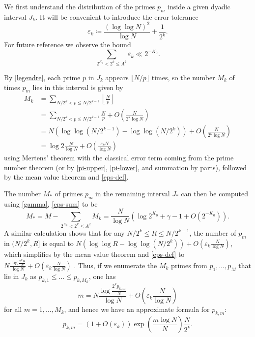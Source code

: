 \documentclass[12pt,a4paper,reqno]{amsart}
\numberwithin{equation}{section}
\theoremstyle{plain}
\theoremstyle{definition}
\newcommand\eps{\varepsilon}
\begin{document}
We first understand the distribution of the primes $p_m$ inside a given dyadic interval $J_k$.  It will be convenient to introduce the error tolerance
\begin{equation}\label{eps-def}
   \eps_k \coloneqq \frac{(\log\log N)^2}{\log N} + \frac{1}{2^k}.
\end{equation}
For future reference we observe the bound
\begin{equation}\label{eps-sum}
\sum_{2^{K_0} < 2^k \leq A^2} \eps_k \ll 2^{-K_0}.
\end{equation}


By \eqref{legendre}, each prime $p$ in $J_k$ appears $\lfloor N/p\rfloor$ times, so the number $M_k$ of times $p_m$ lies in this interval is given by
\begin{align*}
  M_k &= \sum_{N/2^k < p \leq N/2^{k-1}} \left\lfloor \frac{N}{p} \right\rfloor \\
  &= \sum_{N/2^k < p \leq N/2^{k-1}} \frac{N}{p} + O\left( \frac{N}{2^k \log N} \right) \\
  &= N(\log\log(N/2^{k-1}) - \log\log(N/2^k)) + O\left( \frac{N}{2^k \log N}\right)\\
  &= \log 2 \frac{N}{\log N} + O\left( \frac{\eps_k N}{\log N} \right)
\end{align*}
using Mertens' theorem with the classical error term coming from the prime number theorem (or by \eqref{pi-upper}, \eqref{pi-lower}, and summation by parts), followed by the mean value theorem and \eqref{eps-def}.

The number $M_*$ of primes $p_m$ in the remaining interval $J_*$ can then be computed using \eqref{gamma}, \eqref{eps-sum} to be
\begin{equation}\label{ms}
 M_* = M - \sum_{2^{K_0} < 2^k \leq A^2} M_k = \frac{N}{\log N} (\log 2^{K_0} + \gamma - 1 + O(2^{-K_0}) ).
\end{equation}
A similar calculation shows that for any $N/2^k \leq R \leq N/2^{k-1}$, the number of $p_m$ in $(N/2^k, R]$ is equal to
$N(\log\log R - \log\log(N/2^k)) + O( \eps_k \frac{N}{\log N} )$, which simplifies by the mean value theorem and \eqref{eps-def} to
$N\frac{\log \frac{2^k R}{N}}{\log N} + O( \eps_k \frac{N}{\log N} )$
.  Thus, if we enumerate the $M_k$ primes from $p_1,\dots,p_M$ that lie in $J_k$ as $p_{k,1} \leq \dots \leq p_{k,M_k}$, one has
$$ m = N\frac{\log \frac{2^k p_{k,m}}{N}}{\log N} + O\left( \eps_k \frac{N}{\log N} \right)$$
for all $m=1,\dots,M_k$, and hence we have an approximate formula for $p_{k,m}$:
$$ p_{k,m} = (1 + O(\eps_k)) \exp\left( \frac{m \log N}{N} \right) \frac{N}{2^k}.$$
\end{document}
